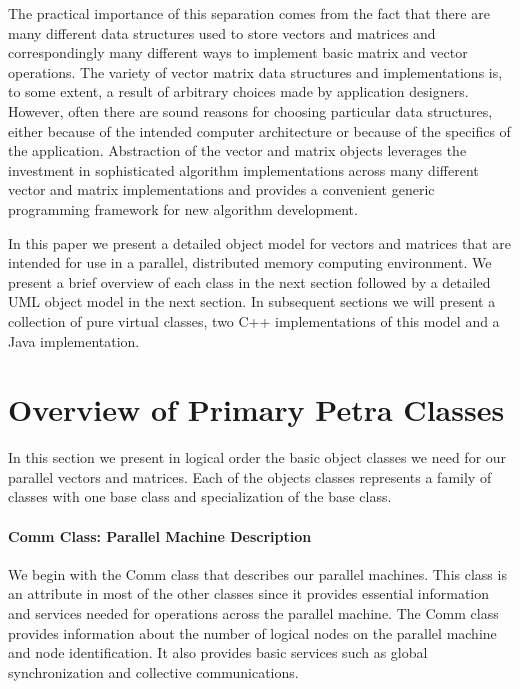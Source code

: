 \documentclass[12pt,relax]{PetraObjectModel}
\begin{document}
The practical importance of this separation comes from the fact 
that there are many different data structures used to store 
vectors and matrices and correspondingly many different ways 
to implement basic matrix and vector operations.  The variety 
of vector matrix data structures and implementations is, to 
some extent, a result of arbitrary choices made by application 
designers.  However, often there are sound reasons for choosing 
particular data structures, either because of the intended 
computer architecture or because of the specifics of the 
application.  Abstraction of the vector and matrix objects 
leverages the investment in sophisticated algorithm implementations 
across many different vector and matrix implementations and 
provides a convenient generic programming framework for new 
algorithm development.

In this paper we present a detailed object model for vectors 
and matrices that are intended for use in a parallel, distributed 
memory computing environment.  We present a brief overview of 
each class in the next section followed by a detailed UML object 
model in the next section.  In subsequent sections we will present 
a collection of pure virtual classes, two C++ implementations of 
this model and a Java implementation.


\section{Overview of Primary Petra Classes}

In this section we present in logical order the basic object classes 
we need for our parallel vectors and matrices.  Each of the objects 
classes represents a family of classes with one base class and 
specialization of the base class.

\paragraph{Comm Class:  Parallel Machine Description}

We begin with the Comm class that describes our parallel machines.  
This class is an attribute in most of the other classes since it provides 
essential information and services needed for operations across the 
parallel machine.  The Comm class provides information about the number 
of  logical nodes on the parallel machine and node identification.  It 
also provides basic services such as global synchronization and collective 
communications.
\end{document}
